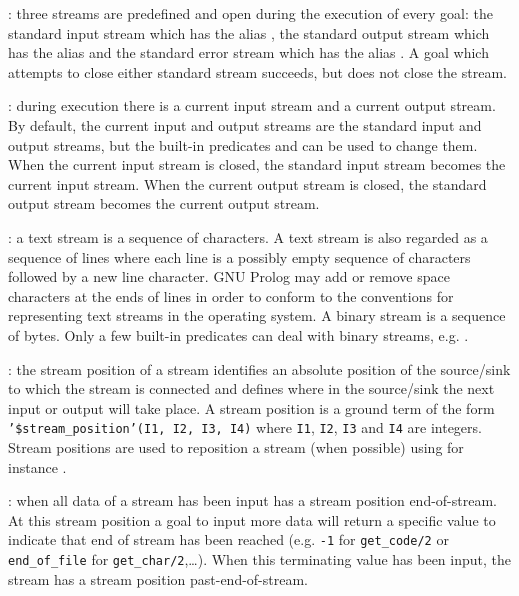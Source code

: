 : three streams are predefined and open during the
execution of every goal: the standard input stream which has the alias
, the standard output stream which has the alias
 and the standard error stream which has the alias
. A goal which attempts to close either standard stream
succeeds, but does not close the stream.

: during execution there is a current input stream
and a current output stream. By default, the current input and output
streams are the standard input and output streams, but the built-in
predicates   and
  can be used to change them.
When the current input stream is closed, the standard input stream becomes
the current input stream. When the current output stream is closed, the
standard output stream becomes the current output stream.

: a text stream is a sequence of
characters. A text stream is also regarded as a sequence of lines where each
line is a possibly empty sequence of characters followed by a new line
character. GNU Prolog may add or remove space characters at the ends of lines
in order to conform to the conventions for representing text streams in the
operating system. A binary stream is a sequence of bytes. Only a few
built-in predicates can deal with binary streams, e.g.
 .

: the stream position of a stream identifies an
absolute position of the source/sink to which the stream is connected and
defines where in the source/sink the next input or output will take place. A
stream position is a ground term of the form
\texttt{'\$stream\_position'(I1, I2, I3, I4)} where \texttt{I1},
\texttt{I2}, \texttt{I3} and \texttt{I4} are integers. Stream positions are
used to reposition a stream (when possible) using for instance
 .

: when all data of a stream
 has been input  has a stream position
end-of-stream. At this stream position a goal to input more data will return
a specific value to indicate that end of stream has been reached (e.g.
\texttt{-1} for \texttt{get\_code/2} or \texttt{end\_of\_file} for
\texttt{get\_char/2},\ldots). When this terminating value has been input, the
stream has a stream position past-end-of-stream.

